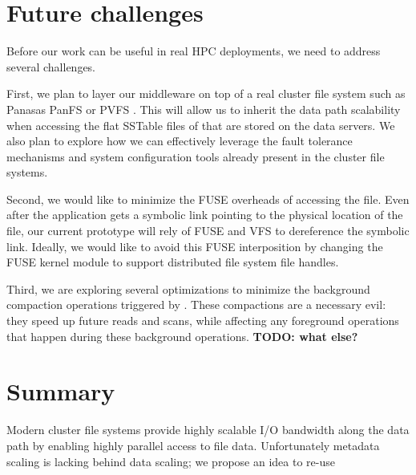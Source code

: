 \section{Future challenges}
\label{futurework}

Before our work can be useful in real HPC deployments, we need to address
several challenges.

First, we plan to layer our middleware on top of a real cluster file system
such as Panasas PanFS \citep{panfs:welch08} or PVFS \citep{pvfs:www}. This will
allow us to inherit the data path scalability when accessing the flat SSTable
files of \ldb that are stored on the data servers. We also plan to explore how
we can effectively leverage the fault tolerance mechanisms and system
configuration tools already present in the cluster file systems.

Second, we would like to minimize the FUSE overheads of accessing the file.
Even after the application gets a symbolic link pointing to the physical
location of the file, our current prototype will rely of FUSE and VFS to
dereference the symbolic link. Ideally, we would like to avoid this FUSE
interposition by changing the FUSE kernel module to support distributed file
system file handles. 

Third, we are exploring several optimizations to minimize the background
compaction operations triggered by \ldb. These compactions are a necessary
evil: they speed up future reads and scans, while affecting any foreground
operations that happen during these background operations. {\bf TODO: what else?}

\section{Summary}
\label{summary}

Modern cluster file systems provide highly scalable I/O bandwidth along the
data path by enabling highly parallel access to file data.
Unfortunately metadata scaling is lacking behind data scaling; we propose an
idea to re-use 




